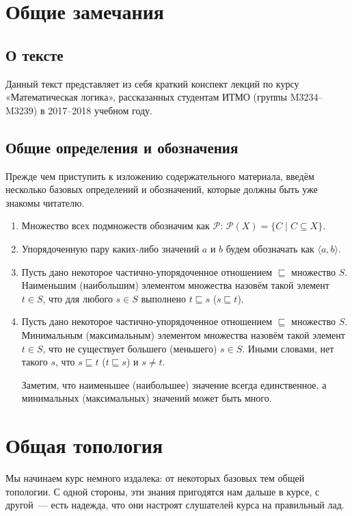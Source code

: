 \documentclass[a4paper,11pt]{article}
\theoremstyle{definition}
\begin{document}
\section{Общие замечания}
\subsection{О тексте}
Данный текст представляет из себя краткий конспект лекций по курсу
«Математическая логика», рассказанных студентам ИТМО (группы M3234--M3239) в
2017--2018 учебном году.

\subsection{Общие определения и обозначения}
Прежде чем приступить к изложению содержательного материала, введём несколько
базовых определений и обозначений, которые должны быть уже знакомы читателю.
\begin{enumerate}
\item Множество всех подмножеств обозначим как $\mathcal{P}$:
  $\mathcal{P}(X) = \{C \mid C \subseteq X\}$.
\item Упорядоченную пару каких-либо значений $a$ и $b$ будем обозначать как
  $\langle a, b\rangle$.
\item Пусть дано некоторое частично-упорядоченное отношением $\sqsubseteq$
  множество $S$. Наименьшим (наибольшим) элементом множества назовём такой
  элемент $t \in S$, что для любого $s \in S$ выполнено $t \sqsubseteq s$
  ($s \sqsubseteq t$).
\item Пусть дано некоторое частично-упорядоченное отношением $\sqsubseteq$
  множество $S$. Минимальным (максимальным) элементом множества назовём такой
  элемент $t \in S$, что не существует большего (меньшего) $s \in S$. Иными
  словами, нет такого $s$, что $s \sqsubseteq t$ ($t \sqsubseteq s$) и $s \ne t$.

  Заметим, что наименьшее (наибольшее) значение всегда единственное, а
  минимальных (максимальных) значений может быть много.
\end{enumerate}

\section{Общая топология}
Мы начинаем курс немного издалека: от некоторых базовых тем общей топологии. С
одной стороны, эти знания пригодятся нам дальше в курсе, с другой~--- есть
надежда, что они настроят слушателей курса на правильный лад.
\end{document}

